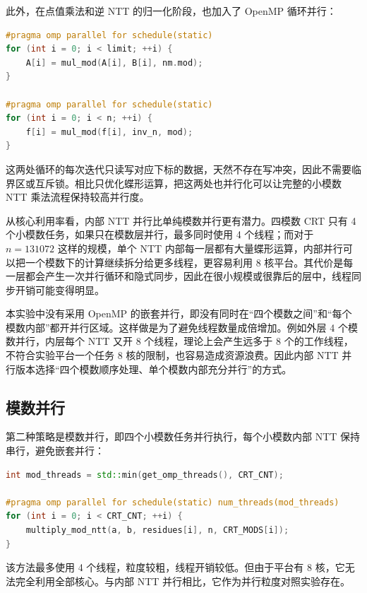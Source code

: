 \documentclass[a4paper]{article}
\begin{document}
此外，在点值乘法和逆 NTT 的归一化阶段，也加入了 OpenMP 循环并行：

\begin{lstlisting}[title=点值乘法与逆变换缩放并行,frame=trbl,language={C++}]
#pragma omp parallel for schedule(static)
for (int i = 0; i < limit; ++i) {
    A[i] = mul_mod(A[i], B[i], nm.mod);
}

#pragma omp parallel for schedule(static)
for (int i = 0; i < n; ++i) {
    f[i] = mul_mod(f[i], inv_n, mod);
}
\end{lstlisting}

这两处循环的每次迭代只读写对应下标的数据，天然不存在写冲突，因此不需要临界区或互斥锁。相比只优化蝶形运算，把这两处也并行化可以让完整的小模数 NTT 乘法流程保持较高并行度。

从核心利用率看，内部 NTT 并行比单纯模数并行更有潜力。四模数 CRT 只有 4 个小模数任务，如果只在模数层并行，最多同时使用 4 个线程；而对于 $n=131072$ 这样的规模，单个 NTT 内部每一层都有大量蝶形运算，内部并行可以把一个模数下的计算继续拆分给更多线程，更容易利用 8 核平台。其代价是每一层都会产生一次并行循环和隐式同步，因此在很小规模或很靠后的层中，线程同步开销可能变得明显。

本实验中没有采用 OpenMP 的嵌套并行，即没有同时在“四个模数之间”和“每个模数内部”都开并行区域。这样做是为了避免线程数量成倍增加。例如外层 4 个模数并行，内层每个 NTT 又开 8 个线程，理论上会产生远多于 8 个的工作线程，不符合实验平台一个任务 8 核的限制，也容易造成资源浪费。因此内部 NTT 并行版本选择“四个模数顺序处理、单个模数内部充分并行”的方式。

\subsection{模数并行}

第二种策略是模数并行，即四个小模数任务并行执行，每个小模数内部 NTT 保持串行，避免嵌套并行：

\begin{lstlisting}[title=OpenMP 模数并行,frame=trbl,language={C++}]
int mod_threads = std::min(get_omp_threads(), CRT_CNT);

#pragma omp parallel for schedule(static) num_threads(mod_threads)
for (int i = 0; i < CRT_CNT; ++i) {
    multiply_mod_ntt(a, b, residues[i], n, CRT_MODS[i]);
}
\end{lstlisting}

该方法最多使用 4 个线程，粒度较粗，线程开销较低。但由于平台有 8 核，它无法完全利用全部核心。与内部 NTT 并行相比，它作为并行粒度对照实验存在。
\end{document}
